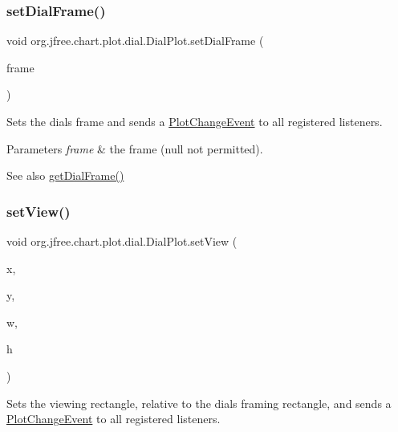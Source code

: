 \subsubsection{\texorpdfstring{set\+Dial\+Frame()}{setDialFrame()}}
{\footnotesize\ttfamily void org.\+jfree.\+chart.\+plot.\+dial.\+Dial\+Plot.\+set\+Dial\+Frame (\begin{DoxyParamCaption}\item[{\mbox{\hyperlink{interfaceorg_1_1jfree_1_1chart_1_1plot_1_1dial_1_1_dial_frame}{Dial\+Frame}}}]{frame }\end{DoxyParamCaption})}

Sets the dial\textquotesingle{}s frame and sends a \mbox{\hyperlink{}{Plot\+Change\+Event}} to all registered listeners.


\begin{DoxyParams}{Parameters}
{\em frame} & the frame ({\ttfamily null} not permitted).\\
\hline
\end{DoxyParams}
\begin{DoxySeeAlso}{See also}
\mbox{\hyperlink{classorg_1_1jfree_1_1chart_1_1plot_1_1dial_1_1_dial_plot_ad7f8de956f589e9503b74c8713f93145}{get\+Dial\+Frame()}} 
\end{DoxySeeAlso}
\mbox{\label{classorg_1_1jfree_1_1chart_1_1plot_1_1dial_1_1_dial_plot_ac66e780fbd6679eed711805ba1d47d77}} 
\subsubsection{\texorpdfstring{set\+View()}{setView()}}
{\footnotesize\ttfamily void org.\+jfree.\+chart.\+plot.\+dial.\+Dial\+Plot.\+set\+View (\begin{DoxyParamCaption}\item[{double}]{x,  }\item[{double}]{y,  }\item[{double}]{w,  }\item[{double}]{h }\end{DoxyParamCaption})}

Sets the viewing rectangle, relative to the dial\textquotesingle{}s framing rectangle, and sends a \mbox{\hyperlink{}{Plot\+Change\+Event}} to all registered listeners.


